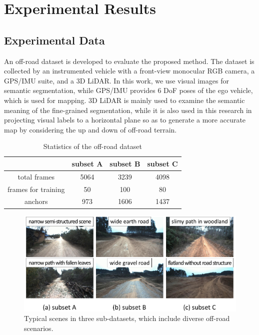 \documentclass[letterpaper, 10 pt, conference]{ieeeconf}  %
\begin{document}
	\section{Experimental Results}	\label{exp}
	\subsection{Experimental Data}
	An off-road dataset is developed to evaluate the proposed method.
	The dataset is collected by an instrumented vehicle with a front-view monocular RGB camera,
	a GPS/IMU suite, and a 3D LiDAR. In this work, we use visual images for semantic segmentation, 
	while GPS/IMU provides 6 DoF poses of the ego vehicle, which is used for mapping. 
	3D LiDAR is mainly used to examine the semantic meaning of the fine-grained segmentation, 
	while it is also used in this research in projecting visual labels to a horizontal plane so as to generate a more accurate map by considering the up and down of off-road terrain.
	
	\begin{table}[]
		\centering
		\caption{Statistics of the off-road dataset}
		\label{tab:dataset}
		\begin{tabular}{cccc} 
			\hline
			& subset A & subset B & subset C  \\ 
			\hline
			total frames        & 5064     & 3239     & 4098      \\
			frames for training & 50       & 100      & 80        \\
			anchors       & 973      & 1606     & 1437      \\
			\hline
		\end{tabular}
	\end{table}
	
	\begin{figure}[]
		\centering
		\includegraphics[scale=0.28]{dataset.pdf}
		\caption{Typical scenes in three sub-datasets, which include diverse off-road scenarios.}
		\label{fig:dataset}
	\end{figure}
	
\end{document}
